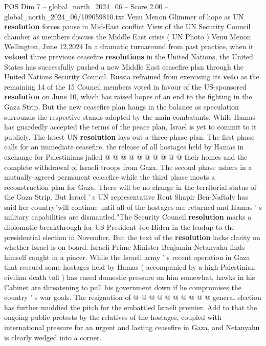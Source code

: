 \begin{textsample}{POS Dim 7 – global\_north\_2024\_06 – Score 2.00 – global\_north\_2024\_06/109059810.txt}  \label{ex:f7_pos_317}
Venu Menon Glimmer of hope as UN \textbf{resolution} forces pause in Mid-East conflict View of the UN Security Council chamber as members discuss the Middle East crisis ( UN Photo ) Venu Menon Wellington, June 12,2024 In a dramatic turnaround from past practice, when it \textbf{vetoed} three previous ceasefire \textbf{resolutions} in the United Nations, the United States has successfully pushed a new Middle East ceasefire plan through the United Nations Security Council.
Russia refrained from exercising its \textbf{veto} as the remaining 14 of the 15 Council members voted in favour of the US-sponsored \textbf{resolution} on June 10, which has raised hopes of an end to the fighting in the Gaza Strip.
But the new ceasefire plan hangs in the balance as speculation surrounds the respective stands adopted by the main combatants.
While Hamas has guardedly accepted the terms of the peace plan, Israel is yet to commit to it publicly.
The latest UN \textbf{resolution} lays out a three-phase plan.
The first phase calls for an immediate ceasefire, the release of all hostages held by Hamas in exchange for Palestinians jailed @ @ @ @ @ @ @ @ @ @ their homes and the complete withdrawal of Israeli troops from Gaza.
The second phase ushers in a mutually-agreed permanent ceasefire while the third phase moots a reconstruction plan for Gaza.
There will be no change in the territorial status of the Gaza Strip.
But Israel ' s UN representative Reut Shapir Ben-Naftaly has said her country"will continue until all of the hostages are returned and Hamas ' s military capabilities are dismantled."The Security Council \textbf{resolution} marks a diplomatic breakthrough for US President Joe Biden in the leadup to the presidential election in November.
But the text of the \textbf{resolution} lacks clarity on whether Israel is on board.
Israeli Prime Minister Benjamin Netanyahu finds himself caught in a pincer.
While the Israeli army ' s recent operation in Gaza that rescued some hostages held by Hamas ( accompanied by a high Palestinian civilian death toll ) has eased domestic pressure on him somewhat, hawks in his Cabinet are threatening to pull his government down if he compromises the country ' s war goals.
The resignation of @ @ @ @ @ @ @ @ @ @ general election has further muddied the pitch for the embattled Israeli premier.
Add to that the ongoing public protests by the relatives of the hostages, coupled with international pressure for an urgent and lasting ceasefire in Gaza, and Netanyahu is clearly wedged into a corner.

\end{textsample}
